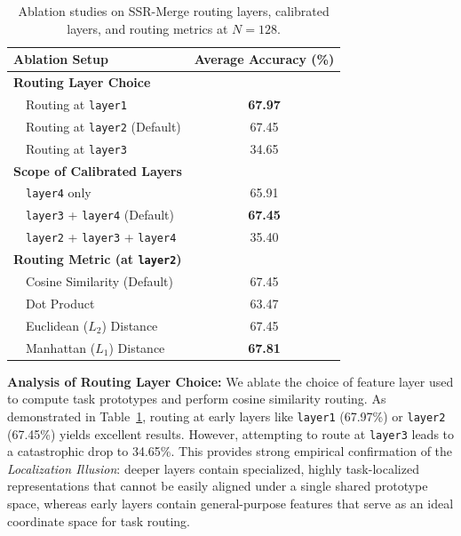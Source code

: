 \documentclass{article}
\theoremstyle{plain}
\theoremstyle{definition}
\theoremstyle{remark}
\begin{document}
\begin{table}[h]
\caption{Ablation studies on SSR-Merge routing layers, calibrated layers, and routing metrics at $N=128$.}
\label{tab:ablations}
\vskip 0.15in
\begin{center}
\begin{small}
\begin{tabular}{lc}
\toprule
Ablation Setup & Average Accuracy (\%) \\
\midrule
\textbf{Routing Layer Choice} \\
~~Routing at \texttt{layer1} & \textbf{67.97} \\
~~Routing at \texttt{layer2} (Default) & 67.45 \\
~~Routing at \texttt{layer3} & 34.65 \\
\midrule
\textbf{Scope of Calibrated Layers} \\
~~\texttt{layer4} only & 65.91 \\
~~\texttt{layer3} + \texttt{layer4} (Default) & \textbf{67.45} \\
~~\texttt{layer2} + \texttt{layer3} + \texttt{layer4} & 35.40 \\
\midrule
\textbf{Routing Metric (at \texttt{layer2})} \\
~~Cosine Similarity (Default) & 67.45 \\
~~Dot Product & 63.47 \\
~~Euclidean ($L_2$) Distance & 67.45 \\
~~Manhattan ($L_1$) Distance & \textbf{67.81} \\
\bottomrule
\end{tabular}
\end{small}
\end{center}
\vskip -0.1in
\end{table}

\textbf{Analysis of Routing Layer Choice:} We ablate the choice of feature layer used to compute task prototypes and perform cosine similarity routing. As demonstrated in Table~\ref{tab:ablations}, routing at early layers like \texttt{layer1} (67.97\%) or \texttt{layer2} (67.45\%) yields excellent results. However, attempting to route at \texttt{layer3} leads to a catastrophic drop to 34.65\%. This provides strong empirical confirmation of the \textit{Localization Illusion}: deeper layers contain specialized, highly task-localized representations that cannot be easily aligned under a single shared prototype space, whereas early layers contain general-purpose features that serve as an ideal coordinate space for task routing.
\end{document}
